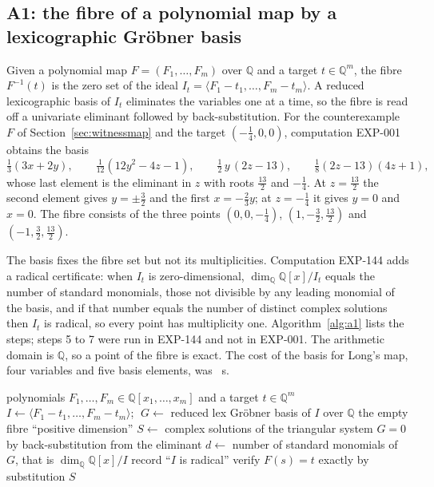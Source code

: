 \documentclass[11pt]{article}
\theoremstyle{remark}
\newcommand{\Q}{\mathbb{Q}}
\newcommand{\EXP}[1]{\mbox{EXP-#1}}
\begin{document}


\subsection{A1: the fibre of a polynomial map by a lexicographic Gr\"obner basis}\label{sec:a1}

Given a polynomial map $F=(F_1,\dots,F_m)$ over $\Q$ and a target $t\in\Q^m$, the fibre $F^{-1}(t)$ is the zero set of the ideal $I_t=\langle F_1-t_1,\dots,F_m-t_m\rangle$. A reduced lexicographic basis of $I_t$ eliminates the variables one at a time, so the fibre is read off a univariate eliminant followed by back-substitution. For the counterexample $F$ of Section~\ref{sec:witnessmap} and the target $(-\tfrac14,0,0)$, computation \EXP{001} obtains the basis
\begin{equation}\label{eq:basis}
\tfrac13(3x+2y),\qquad \tfrac1{12}(12y^2-4z-1),\qquad \tfrac12\,y\,(2z-13),\qquad \tfrac18(2z-13)(4z+1),
\end{equation}
whose last element is the eliminant in $z$ with roots $\tfrac{13}2$ and $-\tfrac14$. At $z=\tfrac{13}2$ the second element gives $y=\pm\tfrac32$ and the first $x=-\tfrac23y$; at $z=-\tfrac14$ it gives $y=0$ and $x=0$. The fibre consists of the three points $(0,0,-\tfrac14)$, $(1,-\tfrac32,\tfrac{13}2)$ and $(-1,\tfrac32,\tfrac{13}2)$.

The basis fixes the fibre set but not its multiplicities. Computation \EXP{144} adds a radical certificate: when $I_t$ is zero-dimensional, $\dim_\Q\Q[x]/I_t$ equals the number of standard monomials, those not divisible by any leading monomial of the basis, and if that number equals the number of distinct complex solutions then $I_t$ is radical, so every point has multiplicity one. Algorithm~\ref{alg:a1} lists the steps; steps 5 to 7 were run in \EXP{144} and not in \EXP{001}. The arithmetic domain is $\Q$, so a point of the fibre is exact. The cost of the basis for Long's map, four variables and five basis elements, was \npoissongb\ s.

\begin{algorithm}[t]
\caption{A1, the fibre of a polynomial map by a lexicographic basis.}\label{alg:a1}
\begin{algorithmic}[1]
\Require polynomials $F_1,\dots,F_m\in\Q[x_1,\dots,x_m]$ and a target $t\in\Q^m$
\State $I\gets\langle F_1-t_1,\dots,F_m-t_m\rangle$; $\;G\gets$ reduced lex Gr\"obner basis of $I$ over $\Q$
 \Return the empty fibre \EndIf
{} \Return ``positive dimension'' \EndIf
\State $S\gets$ complex solutions of the triangular system $G=0$ by back-substitution from the eliminant
\State $d\gets$ number of standard monomials of $G$, that is $\dim_\Q\Q[x]/I$
 \State record ``$I$ is radical'' \EndIf
{} \State verify $F(s)=t$ exactly by substitution \EndFor
\State \Return $S$
\end{algorithmic}
\end{algorithm}
\end{document}
